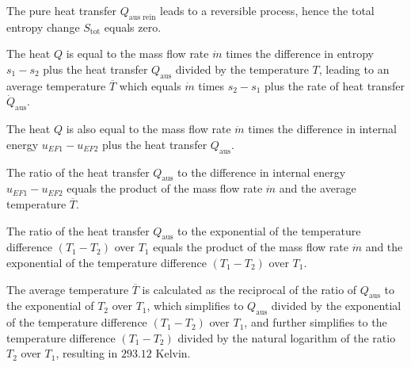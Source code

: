 The pure heat transfer \( Q_{\text{aus rein}} \) leads to a reversible process, hence the total entropy change \( S_{\text{tot}} \) equals zero.

The heat \( Q \) is equal to the mass flow rate \( \dot{m} \) times the difference in entropy \( s_1 - s_2 \) plus the heat transfer \( Q_{\text{aus}} \) divided by the temperature \( T \), leading to an average temperature \( \overline{T} \) which equals \( \dot{m} \) times \( s_2 - s_1 \) plus the rate of heat transfer \( \dot{Q}_{\text{aus}} \).

The heat \( Q \) is also equal to the mass flow rate \( \dot{m} \) times the difference in internal energy \( u_{EF1} - u_{EF2} \) plus the heat transfer \( Q_{\text{aus}} \).

The ratio of the heat transfer \( Q_{\text{aus}} \) to the difference in internal energy \( u_{EF1} - u_{EF2} \) equals the product of the mass flow rate \( \dot{m} \) and the average temperature \( \overline{T} \).

The ratio of the heat transfer \( Q_{\text{aus}} \) to the exponential of the temperature difference \( (T_1 - T_2) \) over \( T_1 \) equals the product of the mass flow rate \( \dot{m} \) and the exponential of the temperature difference \( (T_1 - T_2) \) over \( T_1 \).

The average temperature \( \overline{T} \) is calculated as the reciprocal of the ratio of \( Q_{\text{aus}} \) to the exponential of \( T_2 \) over \( T_1 \), which simplifies to \( Q_{\text{aus}} \) divided by the exponential of the temperature difference \( (T_1 - T_2) \) over \( T_1 \), and further simplifies to the temperature difference \( (T_1 - T_2) \) divided by the natural logarithm of the ratio \( T_2 \) over \( T_1 \), resulting in \( 293.12 \) Kelvin.